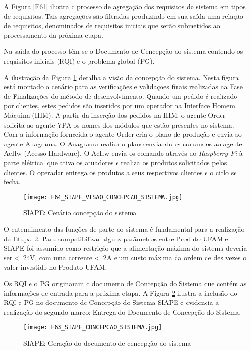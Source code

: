 A Figura \ref{F61} ilustra  o processo de agregação dos requisitos do sistema em tipos de requisitos. Tais agregações são filtradas produzindo em sua saída uma relação de requisitos, denominados de requisitos iniciais que serão submetidos ao processamento da próxima etapa. 

Na saída do processo têm-se o Documento de Concepção do sistema contendo os requisitos iniciais (RQI) e o problema global (PG).

A ilustração da Figura \ref{F64}  detalha a visão da concepção do sistema. Nesta figura está montado o cenário para as verificações e validações finais realizadas na Fase de Finalizações do método de desenvolvimento. Quando um pedido é realizado por clientes, estes pedidos são inseridos por um operador na Interface Homem Máquina (IHM). A partir da inserção dos pedidos na IHM, o agente Order solicita ao agente YPA os nomes dos módulos que estão presentes no sistema. Com a informação fornecida o agente Order cria o plano de produção e envia ao agente Anagrama. O Anagrama realiza o plano enviando os comandos ao agente AcHw (Acesso Hardware). O AcHw envia os comando através do \textit {Raspberry Pi} à parte elétrica, que ativa os atuadores e realiza os produtos solicitados pelos clientes. O operador entrega os produtos a seus respectivos clientes e o ciclo se fecha.     

\begin{figure}[!h]
	\centering
	\texttt{[image: F64\_SIAPE\_VISAO\_CONCEPCAO\_SISTEMA.jpg]} 
	\caption{SIAPE: Cenário concepção do sistema}
	\label{F64}
\end{figure}


O entendimento das funções de parte do sistema é fundamental para a realização da Etapa~2. Para compatibilizar  alguns parâmetros entre Produto UFAM e SIAPE foi assumido como restrição que a alimentação máxima do sistema deveria ser <~24V, com uma corrente <~2A e um custo máxima da ordem de dez vezes o valor investido no Produto UFAM. 

Os RQI e o PG originaram o documento de Concepção do Sistema que contém as informações de entrada para a próxima etapa. A Figura \ref{F63} ilustra a inclusão do RQI e PG no documento de Concepção do Sistema SIAPE e evidencia a realização do segundo marco: Entrega do Documento de Concepção do Sistema.

\begin{figure}[!h]
	\centering
	\texttt{[image: F63\_SIAPE\_CONCEPCAO\_SISTEMA.jpg]} 
	\caption{SIAPE: Geração do documento de concepção do sistema}
	\label{F63}
\end{figure}

